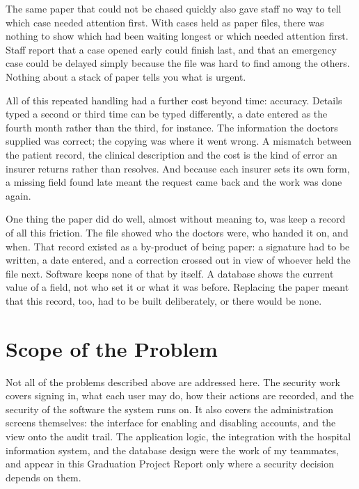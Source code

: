 The same paper that could not be chased quickly also gave staff no way to tell which case needed attention first. With cases held as paper files, there was nothing to show which had been waiting longest or which needed attention first. Staff report that a case opened early could finish last, and that an emergency case could be delayed simply because the file was hard to find among the others. Nothing about a stack of paper tells you what is urgent.

All of this repeated handling had a further cost beyond time: accuracy. Details typed a second or third time can be typed differently, a date entered as the fourth month rather than the third, for instance. The information the doctors supplied was correct; the copying was where it went wrong. A mismatch between the patient record, the clinical description and the cost is the kind of error an insurer returns rather than resolves. And because each insurer sets its own form, a missing field found late meant the request came back and the work was done again.

One thing the paper did do well, almost without meaning to, was keep a record of all this friction. The file showed who the doctors were, who handed it on, and when. That record existed as a by-product of being paper: a signature had to be written, a date entered, and a correction crossed out in view of whoever held the file next. Software keeps none of that by itself. A database shows the current value of a field, not who set it or what it was before. Replacing the paper meant that this record, too, had to be built deliberately, or there would be none.

\section{Scope of the Problem}
\label{sec:ps-scope}

Not all of the problems described above are addressed here. The security work covers signing in, what each user may do, how their actions are recorded, and the security of the software the system runs on. It also covers the administration screens themselves: the interface for enabling and disabling accounts, and the view onto the audit trail. The application logic, the integration with the hospital information system, and the database design were the work of my teammates, and appear in this Graduation Project Report only where a security decision depends on them.

